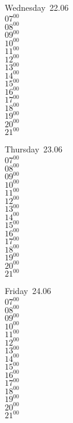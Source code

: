 \documentclass[11pt,a4paper]{book}\usepackage[]{graphicx}\usepackage[]{color}
\begin{document}
\begin{weekdaybox}
  Wednesday~22.06\\
  { 
  \vfill
  $07^{00}$\\
$08^{00}$\\
$09^{00}$\\
$10^{00}$\\
$11^{00}$\\
$12^{00}$\\
$13^{00}$\\
$14^{00}$\\
$15^{00}$\\
$16^{00}$\\
$17^{00}$\\
$18^{00}$\\
$19^{00}$\\
$20^{00}$\\
$21^{00}$\\
  }
\end{weekdaybox}
\clearpage
\begin{headerbox}
\end{headerbox}
\begin{weekdaybox}
  Thursday~23.06\\
  { 
  \vfill
  $07^{00}$\\
$08^{00}$\\
$09^{00}$\\
$10^{00}$\\
$11^{00}$\\
$12^{00}$\\
$13^{00}$\\
$14^{00}$\\
$15^{00}$\\
$16^{00}$\\
$17^{00}$\\
$18^{00}$\\
$19^{00}$\\
$20^{00}$\\
$21^{00}$\\
  }
\end{weekdaybox} 
\begin{weekdaybox}
  Friday~24.06\\
  { 
  \vfill
  $07^{00}$\\
$08^{00}$\\
$09^{00}$\\
$10^{00}$\\
$11^{00}$\\
$12^{00}$\\
$13^{00}$\\
$14^{00}$\\
$15^{00}$\\
$16^{00}$\\
$17^{00}$\\
$18^{00}$\\
$19^{00}$\\
$20^{00}$\\
$21^{00}$\\
  }
\end{weekdaybox}
\end{document}
